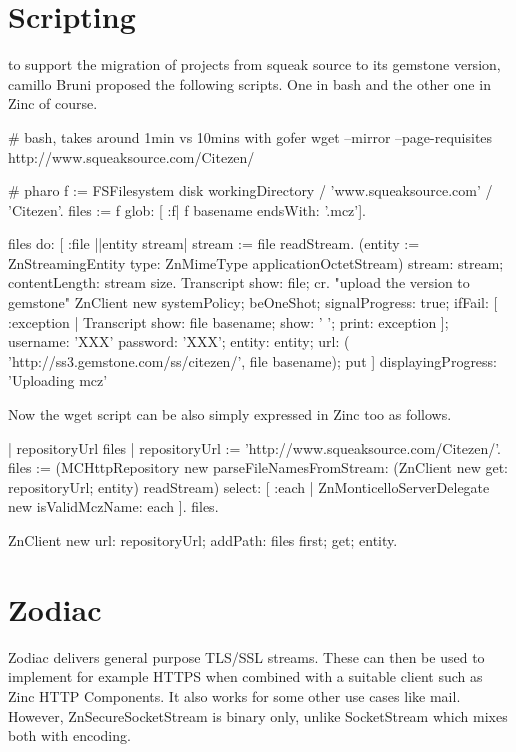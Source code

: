 \documentclass[a4paper,10pt,twoside]{book}
\begin{document}
\section{Scripting}

to support the migration of projects from squeak source to its gemstone version, camillo Bruni proposed the following scripts. One in bash and the other one in Zinc of course. 

\begin{code}
# bash, takes around 1min vs 10mins with gofer
wget --mirror --page-requisites http://www.squeaksource.com/Citezen/
\end{code}

\begin{code}
# pharo 
f := FSFilesystem disk workingDirectory / 'www.squeaksource.com' / 'Citezen'.
files := f glob: [ :f| f basename endsWith: '.mcz'].

files do: [ :file ||entity stream|
	stream := file readStream.
	(entity := ZnStreamingEntity type: ZnMimeType applicationOctetStream)
		stream: stream;
		contentLength: stream size.
	Transcript show: file; cr.
	"upload the version to gemstone"
	ZnClient new
		systemPolicy;
		beOneShot;
		signalProgress: true;
		ifFail: [ :exception | Transcript show: file basename; show: ' '; print: exception ];
		username: 'XXX' password: 'XXX';
		entity: entity;
		url: ( 'http://ss3.gemstone.com/ss/citezen/', file basename);
		put ]
	displayingProgress: 'Uploading mcz'
\end{code}

Now the wget script can be also simply expressed in Zinc too as follows.

\begin{code}{}
| repositoryUrl files |
repositoryUrl := 'http://www.squeaksource.com/Citezen/'.
files := (MCHttpRepository new 
	parseFileNamesFromStream: (ZnClient new get: repositoryUrl; entity) readStream)
	select: [ :each | ZnMonticelloServerDelegate new isValidMczName: each ].
files.

ZnClient new
	url: repositoryUrl;
	addPath: files first;
	get;
	entity.
\end{code}




\section{Zodiac}
Zodiac delivers general purpose TLS/SSL streams.
These can then be used to implement for example HTTPS when combined with a suitable client such as Zinc HTTP Components.
It also works for some other use cases like mail.
However, ZnSecureSocketStream is binary only, unlike SocketStream which mixes both with encoding.
\end{document}
